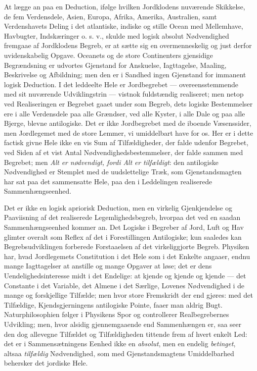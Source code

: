 \documentclass[12pt,a4paper]{book}
\begin{document}
At lægge an paa en Deduction, ifølge hvilken Jordklodens nuværende
Skikkelse, de fem Verdensdele, Asien, Europa, Afrika, Amerika,
Australien, samt Verdenshavets Deling i det atlantiske, indiske og stille
Ocean med Mellemhave, Havbugter, Indskæringer o. s. v., skulde med logisk
absolut Nødvendighed fremgaae af Jordklodens Begreb, er at sætte sig en
overmenneskelig og just derfor uvidenskabelig Opgave. Oceanets og de
store Continenters gjensidige Begrændsning er udvortes Gjenstand for
Anskuelse, Iagttagelse, Maaling, Beskrivelse og Afbildning; men den er i
Sandhed ingen Gjenstand for immanent logisk Deduction. I det leddeelte
Hele er Jordbegrebet --- overeensstemmende med sit nuværende
Udviklingstrin --- vistnok fuldstændig realiseret; men netop ved
Realiseringen er Begrebet gaaet under som Begreb, dets logiske
Bestemmelser ere i alle Verdensdele paa alle Grændser, ved alle Kyster, i
alle Dale og paa alle Bjerge, blevne antilogiske. Det er ikke Jordbegrebet
med de iboende Væsenssider, men Jordlegemet med de store Lemmer, vi
umiddelbart have for os. Her er i dette factisk
givne Hele ikke en vis Sum af Tilfældigheder, der falde udenfor Begrebet,
ved Siden af et vist Antal Nødvendighedsbestemmelser, der falde sammen med
Begrebet; men \emph{Alt er nødvendigt, fordi Alt er tilfældigt}: den
antilogiske Nødvendighed er Stemplet med de uudslettelige Træk, som
Gjenstandsmagten har sat paa det sammensatte Hele, paa den i Leddelingen
realiserede Sammenhængseenhed.

Det er ikke en logisk apriorisk Deduction, men en virkelig Gjenkjendelse og
Paaviisning af det realiserede Legemlighedsbegreb, hvorpaa det ved en
saadan Sammenhængseenhed kommer an. Det Logiske i Begreber af Jord, Luft
og Hav glimter overalt som Reflex af det i Forestillingen Antilogiske; kun
saaledes kan Begrebsudviklingen forberede Forstaaelsen af det
virkeliggjorte Begreb. Physiken har, hvad Jordlegemets Constitution i det
Hele som i det Enkelte angaaer, endnu mange Iagttagelser at anstille og
mange Opgaver at løse; det er dens Uendelighedsinteresse midt i det
Endelige: at kjende og kjende og kjende --- det Constante i det Variable,
det Almene i det Særlige, Lovenes Nødvendighed i de mange og forskjellige
Tilfælde; men hvor store Fremskridt der end gjøres: med det Tilfældige,
Kjendsgjerningens antilogiske Pointe, faaer man aldrig Bugt.
Naturphilosophien følger i Physikens Spor og controllerer Realbegrebernes
Udvikling; men, hvor alsidig gjennemgaaende end Sammenhængen er, saa seer
den dog allevegne Tilfældet og Tilfældigheden tittende frem af hvert enkelt
Led: det er i Sammensætningens Eenhed ikke en \emph{absolut}, men en
endelig \emph{betinget}, altsaa \emph{tilfældig} Nødvendighed, som med
Gjenstandsmagtens Umiddelbarhed behersker det jordiske Hele.
\end{document}
